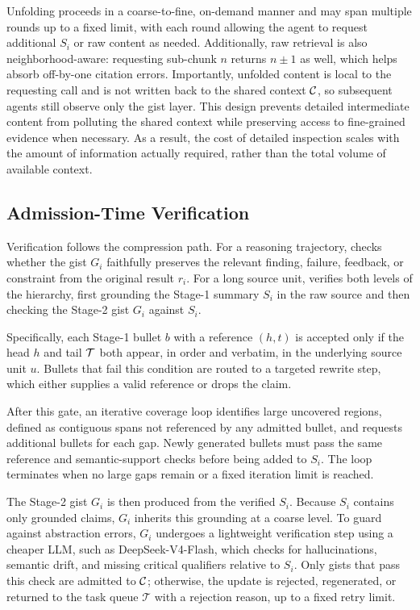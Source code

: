 Unfolding proceeds in a coarse-to-fine, on-demand manner and may span multiple rounds up to a fixed limit, with each round allowing the agent to request additional $S_i$ or raw content as needed. Additionally, raw retrieval is also neighborhood-aware: requesting sub-chunk $n$ returns $n{\pm}1$ as well, which helps absorb off-by-one citation errors. Importantly, unfolded content is local to the requesting call and is not written back to the shared context $\mathcal{C}$, so subsequent agents still observe only the gist layer. This design prevents detailed intermediate content from polluting the shared context while preserving access to fine-grained evidence when necessary. As a result, the cost of detailed inspection scales with the amount of information actually required, rather than the total volume of available context.

\subsection{Admission-Time Verification}
\label{sec:verification}
Verification follows the compression path. For a reasoning trajectory, \toolName{} checks whether the gist $G_i$ faithfully preserves the relevant finding, failure, feedback, or constraint from the original result $r_i$. For a long source unit, \toolName{} verifies both levels of the hierarchy, first grounding the Stage-1 summary $S_i$ in the raw source and then checking the Stage-2 gist $G_i$ against $S_i$.

Specifically, each Stage-1 bullet $b$ with a reference $(h,t)$ is accepted only if the head $h$ and tail $\mathcal{T}$ both appear, in order and verbatim, in the underlying source unit $u$. Bullets that fail this condition are routed to a targeted rewrite step, which either supplies a valid reference or drops the claim.

After this gate, an {iterative coverage loop} identifies large uncovered regions, defined as contiguous spans not referenced by any admitted bullet, and requests additional bullets for each gap. Newly generated bullets must pass the same reference and semantic-support checks before being added to $S_i$. The loop terminates when no large gaps remain or a fixed iteration limit is reached.

The Stage-2 gist $G_i$ is then produced from the verified $S_i$. Because $S_i$ contains only grounded claims, $G_i$ inherits this grounding at a coarse level. To guard against abstraction errors, $G_i$ undergoes a lightweight verification step using a cheaper LLM, such as DeepSeek-V4-Flash, which checks for hallucinations, semantic drift, and missing critical qualifiers relative to $S_i$. Only gists that pass this check are admitted to $\mathcal{C}$; otherwise, the update is rejected, regenerated, or returned to the task queue $\mathcal{T}$ with a rejection reason, up to a fixed retry limit.

